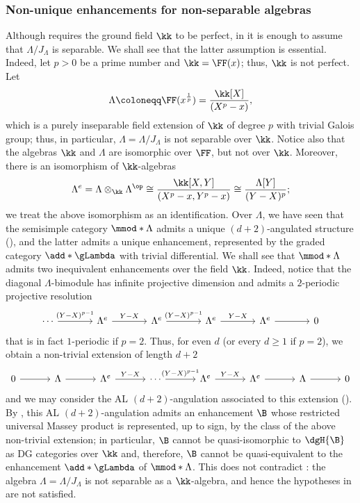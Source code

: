 \documentclass[a4paper]{amsart}
\begin{document}
\subsubsection{Non-unique enhancements for non-separable algebras}
\label{subsubsec:non-unique_non-separable}

Although  requires the ground field $\kk$
to be perfect, in  it is enough to
assume that $\Lambda/J_\Lambda$ is separable. We shall see that the latter
assumption is essential. Indeed, let $p>0$ be a prime number and $\kk=\FF(x)$;
thus, $\kk$ is not perfect. Let
\[
  \Lambda\coloneqq\FF(x^{\frac{1}{p}})=\frac{\kk[X]}{(X^p-x)},
\]
which is a purely inseparable field extension of $\kk$ of degree $p$ with
trivial Galois group; thus, in particular, $\Lambda=\Lambda/J_\Lambda$ is not
separable over $\kk$. Notice also that the algebras $\kk$ and $\Lambda$ are
isomorphic over $\FF$, but not over $\kk$. Moreover, there is an isomorphism
of $\kk$-algebras
\[
  \Lambda^e=\Lambda\otimes_\kk\Lambda^\op\cong\frac{\kk[X,Y]}{(X^p-x,Y^p-x)}\cong\frac{\Lambda[Y]}{(Y-X)^p};
\]
we treat the above isomorphism as an identification. Over $\Lambda$, we have
seen that the semisimple category $\mmod*{\Lambda}$ admits a unique
$(d+2)$-angulated structure (), and the latter admits
a unique enhancement, represented by the graded category $\add*{\gLambda}$ with trivial differential. We shall see
that $\mmod*{\Lambda}$ admits two inequivalent enhancements over the field
$\kk$. Indeed, notice that the diagonal $\Lambda$-bimodule has infinite
projective dimension and admits a $2$-periodic projective resolution
\[
  \begin{tikzcd}[column sep=large]
    \cdots\rar{(Y-X)^{p-1}}&\Lambda^e\rar{Y-X}&\Lambda^e\rar{(Y-X)^{p-1}}&\Lambda^e\rar{Y-X}&\Lambda^e\rar&0
  \end{tikzcd}
\]
that is in fact $1$-periodic if $p=2$. Thus, for even $d$ (or every $d\geq1$ if
$p=2$), we obtain a non-trivial extension of length $d+2$
\[
  \begin{tikzcd}[column sep=11mm]
    0\rar&\Lambda\rar&\Lambda^e\rar{Y-X}&\cdots \rar{(Y-X)^{p-1}}&\Lambda^e\rar{Y-X}&\Lambda^e\rar&\Lambda\rar&0
  \end{tikzcd}
\]
and we may consider the AL $(d+2)$-angulation associated to this extension
(). By , this
AL $(d+2)$-angulation admits an enhancement $\B$ whose restricted universal
Massey product is represented, up to sign, by the class of the above non-trivial extension;
in particular, $\B$ cannot be quasi-isomorphic to $\dgH{\B}$ as DG categories
over $\kk$ and, therefore, $\B$ cannot be quasi-equivalent to the enhancement $\add*{\gLambda}$ of
$\mmod*{\Lambda}$. This does not
contradict : the algebra
$\Lambda=\Lambda/J_\Lambda$ is not separable as a $\kk$-algebra, and hence the
hypotheses in  are not satisfied.
\end{document}
